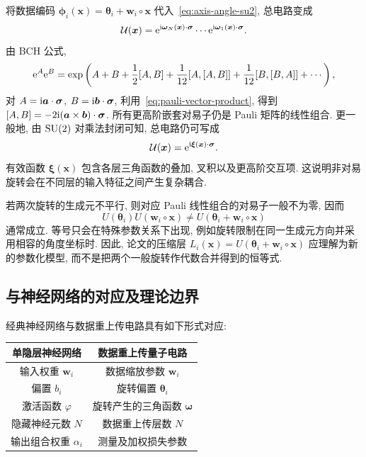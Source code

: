 \documentclass[a4paper]{ctexart}
\begin{document}
将数据编码 $\bm{\phi}_i(\bm{x})=\bm{\theta}_i+\bm{w}_i\circ\bm{x}$ 代入~\eqref{eq:axis-angle-su2}, 总电路变成
\begin{align}
    \mathcal{U}(\bm{x})=\mathrm{e}^{\mathrm{i}\bm{\omega}_N(\bm{x})\cdot\bm{\sigma}}\cdots\mathrm{e}^{\mathrm{i}\bm{\omega}_1(\bm{x})\cdot\bm{\sigma}}.
\end{align}
由 BCH 公式,
\begin{align}
    \mathrm{e}^A\mathrm{e}^B=\exp\left(A+B+\frac{1}{2}[A, B]+\frac{1}{12}[A,[A, B]]+\frac{1}{12}[B,[B, A]]+\cdots\right),
\end{align}
对 $A=\mathrm{i}\bm{a}\cdot\bm{\sigma}$, $B=\mathrm{i}\bm{b}\cdot\bm{\sigma}$, 利用~\eqref{eq:pauli-vector-product}, 得到 $[A, B]=-2\mathrm{i}(\bm{a}\times\bm{b})\cdot\bm{\sigma}$. 所有更高阶嵌套对易子仍是 Pauli 矩阵的线性组合. 更一般地, 由 $\text{SU}(2)$ 对乘法封闭可知, 总电路仍可写成
\begin{align}
    \mathcal{U}(\bm{x})=\mathrm{e}^{\mathrm{i}\bm{\xi}(\bm{x})\cdot\bm{\sigma}}.
\end{align}
有效函数 $\bm{\xi}(\bm{x})$ 包含各层三角函数的叠加, 叉积以及更高阶交互项. 这说明非对易旋转会在不同层的输入特征之间产生复杂耦合.

若两次旋转的生成元不平行, 则对应 Pauli 线性组合的对易子一般不为零, 因而
\begin{equation}
    U(\bm{\theta}_i)U(\bm{w}_i\circ\bm{x})\ne U(\bm{\theta}_i+\bm{w}_i\circ\bm{x})
\end{equation}
通常成立. 等号只会在特殊参数关系下出现, 例如旋转限制在同一生成元方向并采用相容的角度坐标时. 因此, 论文的压缩层 $L_i(\bm{x})=U(\bm{\theta}_i+\bm{w}_i\circ\bm{x})$ 应理解为新的参数化模型, 而不是把两个一般旋转作代数合并得到的恒等式.

\subsection{与神经网络的对应及理论边界}

经典神经网络与数据重上传电路具有如下形式对应:
\begin{center}
    \renewcommand{\arraystretch}{1.2}
    \begin{tabular}{cc}
        \toprule
        单隐层神经网络           & 数据重上传量子电路               \\
        \midrule
        输入权重 $\bm{w}_i$   & 数据缩放参数 $\bm{w}_i$       \\
        偏置 $b_i$          & 旋转偏置 $\bm{\theta}_i$    \\
        激活函数 $\varphi$    & 旋转产生的三角函数 $\bm{\omega}$ \\
        隐藏神经元数 $N$        & 数据重上传层数 $N$             \\
        输出组合权重 $\alpha_i$ & 测量及加权损失参数               \\
        \bottomrule
    \end{tabular}
\end{center}
\end{document}
